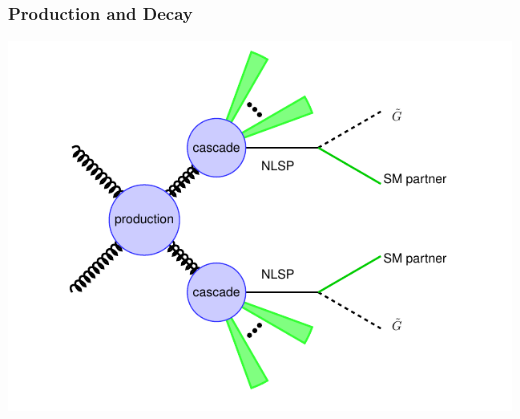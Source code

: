 \documentclass{beamer}
\begin{document}
\begin{frame}
\frametitle{\Huge{Production and Decay }}
   \begin{minipage}[t]{0.7\linewidth}
      \includegraphics[width=0.80\paperwidth]{THESISPLOTS/SUSY-DECAY.pdf}
 \end{minipage}
    
\end{frame}    
\end{document}
